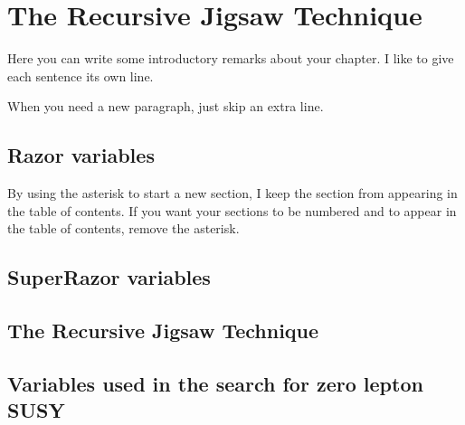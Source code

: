 

\chapter[The Recursive Jigsaw Technique][The Recursive Jigsaw Technique]{The Recursive Jigsaw Technique}

Here you can write some introductory remarks about your chapter.
I like to give each sentence its own line.

When you need a new paragraph, just skip an extra line.

\section{Razor variables}

By using the asterisk to start a new section, I keep the section from appearing in the table of contents.
If you want your sections to be numbered and to appear in the table of contents, remove the asterisk.

\section{SuperRazor variables}

\section{The Recursive Jigsaw Technique}

\section{Variables used in the search for zero lepton SUSY}